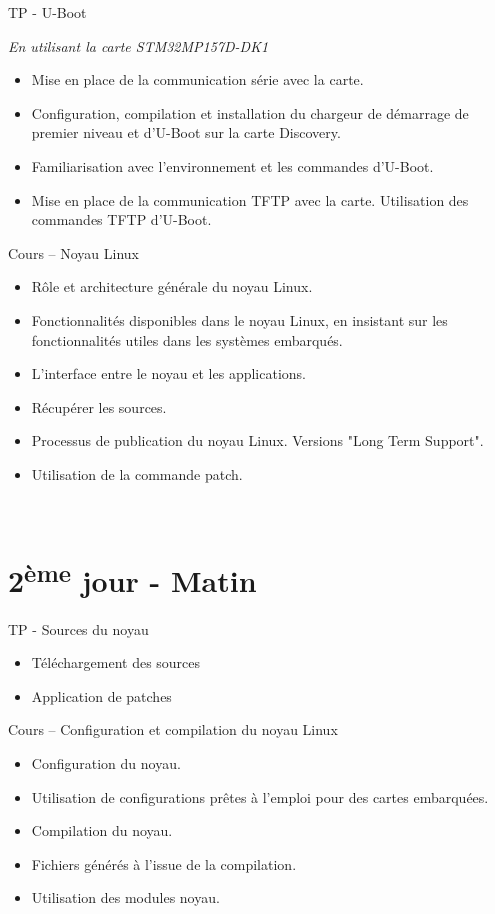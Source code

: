 \documentclass[a4paper,12pt,obeyspaces,spaces,hyphens]{article}
\begin{document}
\feagendatwocolumn
{TP - U-Boot}
{
  {\em En utilisant la carte STM32MP157D-DK1}
  \begin{itemize}
  \item Mise en place de la communication série avec la carte.
  \item Configuration, compilation et installation du chargeur de
	démarrage de premier niveau et d'U-Boot sur la carte Discovery.
  \item Familiarisation avec l'environnement et les commandes d'U-Boot.
  \item Mise en place de la communication TFTP avec la carte.
	Utilisation des commandes TFTP d'U-Boot.
  \end{itemize}
}
{Cours – Noyau Linux}
{
  \begin{itemize}
  \item Rôle et architecture générale du noyau Linux.
  \item Fonctionnalités disponibles dans le noyau Linux, en insistant
	sur les fonctionnalités utiles dans les systèmes embarqués.
  \item L'interface entre le noyau et les applications.
  \item Récupérer les sources.
  \item Processus de publication du noyau Linux. Versions "Long Term Support".
  \item Utilisation de la commande patch.
  \end{itemize}
}
\\

\section{2\textsuperscript{ème} jour - Matin}

\feagendatwocolumn
{TP - Sources du noyau}
{
  \begin{itemize}
  \item Téléchargement des sources
  \item Application de patches
  \end{itemize}
}
{Cours – Configuration et compilation du noyau Linux}
{
  \begin{itemize}
  \item Configuration du noyau.
  \item Utilisation de configurations prêtes à l'emploi pour des cartes embarquées.
  \item Compilation du noyau.
  \item Fichiers générés à l'issue de la compilation.
  \item Utilisation des modules noyau.
  \end{itemize}
}
\end{document}
